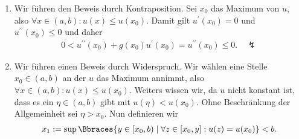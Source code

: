 \begin{solution}
	\phantom{}
	\begin{enumerate}[label = (\roman*)]
		\item Wir führen den Beweis durch Kontraposition. Sei $x_0$ das Maximum von $u$, also $\forall x \in (a, b): u(x) \leq u(x_0)$. Damit gilt $u^\prime(x_0) = 0$ und $u^{\prime\prime}(x_0) \leq 0$ und daher
		\begin{align*}
		0 < u^{\prime\prime}(x_0) + g(x_0) u^\prime(x_0) = u^{\prime\prime}(x_0) \leq 0. \quad \lightning
		\end{align*}
		\item Wir führen einen Beweis durch Widerspruch. Wir wählen eine Stelle $x_0 \in (a,b)$ an der $u$ das Maximum annimmt, also $\forall x \in (a,b): u(x) \leq u(x_0)$. Weiters wissen wir, da $u$ nicht konstant ist, dass es ein $\eta \in (a,b)$ gibt mit $u(\eta) < u(x_0)$. Ohne Beschränkung der Allgemeinheit sei $\eta > x_0$. Nun definieren wir
		\begin{align*}
		x_1 := \sup\Bbraces{y \in [x_0, b) \mid \forall z \in [x_0, y]: u(z) = u(x_0)} < b.
		\end{align*}


\end{enumerate}
\end{solution}
